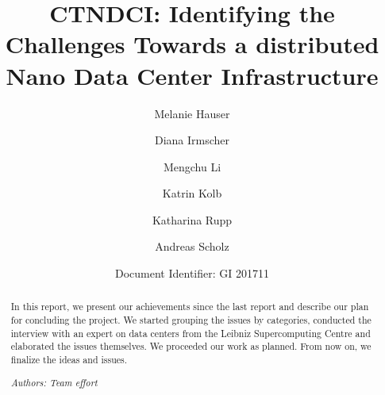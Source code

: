 \documentclass[sigchi-a, authorversion]{acmart}
\begin{document}
\title{CTNDCI: Identifying the Challenges Towards a distributed Nano Data Center Infrastructure}

\author{Melanie Hauser}

\author{Diana Irmscher} 

\author{Mengchu Li}

\author{Katrin Kolb}

\author{Katharina Rupp}

\author{Andreas Scholz}



\author{Document Identifier: GI 201711}
\renewcommand{\shortauthors}{Katrin Kolb et al.}

\begin{abstract}
In this report, we present our achievements since the last report and describe our plan for concluding the project. We started grouping the issues by categories, conducted the interview with an expert on data centers from the Leibniz Supercomputing Centre and elaborated the issues themselves. We proceeded our work as planned. From now on, we finalize the ideas and issues. 



\textit{Authors: Team effort}\\
\end{abstract}


\maketitle
\end{document}
